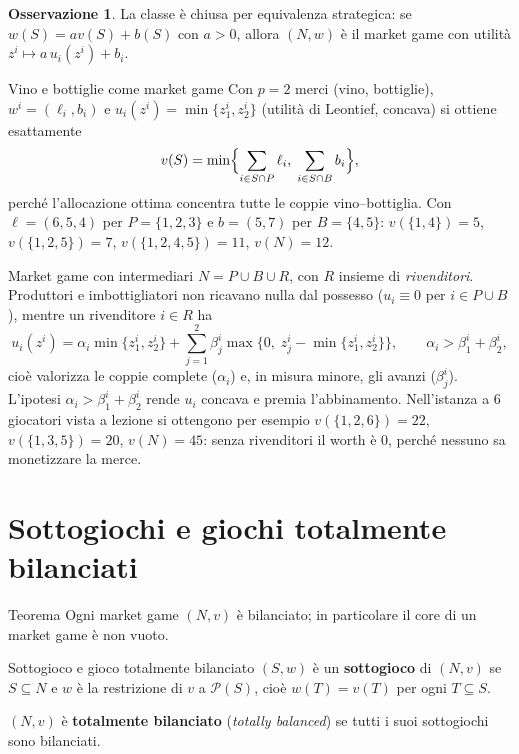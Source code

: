 \documentclass[12pt,a4paper,twoside]{book}
\theoremstyle{plain}
\theoremstyle{definition}
\newtheorem{remark}[theorem]{Osservazione}
\begin{document}
\begin{remark}
La classe è chiusa per equivalenza strategica: se $w(S)=a v(S)+b(S)$ con $a>0$,
allora $(N,w)$ è il market game con utilità $z^i\mapsto a\,u_i(z^i)+b_i$.
\end{remark}

\begin{exbox}{Vino e bottiglie come market game}
Con $p=2$ merci (vino, bottiglie), $w^i=(\ell_i,b_i)$ e
$u_i(z^i)=\min\{z^i_1,z^i_2\}$ (utilità di Leontief, concava) si ottiene
esattamente
\[
  v(S)=\min\Bigl\{\sum_{i\in S\cap P}\ell_i,\;\sum_{i\in S\cap B}b_i\Bigr\},
\]
perché l'allocazione ottima concentra tutte le coppie vino--bottiglia. Con
$\ell=(6,5,4)$ per $P=\{1,2,3\}$ e $b=(5,7)$ per $B=\{4,5\}$: $v(\{1,4\})=5$,
$v(\{1,2,5\})=7$, $v(\{1,2,4,5\})=11$, $v(N)=12$.
\end{exbox}

\begin{exbox}{Market game con intermediari}
$N=P\cup B\cup R$, con $R$ insieme di \emph{rivenditori}. Produttori e
imbottigliatori non ricavano nulla dal possesso ($u_i\equiv 0$ per $i\in P\cup B$),
mentre un rivenditore $i\in R$ ha
\[
  u_i(z^i)=\alpha_i\min\{z^i_1,z^i_2\}+\sum_{j=1}^{2}\beta^i_j\max\{0,\;z^i_j-\min\{z^i_1,z^i_2\}\},
  \qquad \alpha_i>\beta^i_1+\beta^i_2 ,
\]
cioè valorizza le coppie complete ($\alpha_i$) e, in misura minore, gli avanzi
($\beta^i_j$). L'ipotesi $\alpha_i>\beta^i_1+\beta^i_2$ rende $u_i$ concava e
premia l'abbinamento. Nell'istanza a 6 giocatori vista a lezione si ottengono
per esempio $v(\{1,2,6\})=22$, $v(\{1,3,5\})=20$, $v(N)=45$: senza rivenditori
il worth è $0$, perché nessuno sa monetizzare la merce.
\end{exbox}

\section{Sottogiochi e giochi totalmente bilanciati}

\begin{thmbox}{Teorema}
Ogni market game $(N,v)$ è bilanciato; in particolare il core di un market game
è non vuoto.
\end{thmbox}

\begin{defbox}{Sottogioco e gioco totalmente bilanciato}
$(S,w)$ è un \textbf{sottogioco} di $(N,v)$ se $S\subseteq N$ e $w$ è la
restrizione di $v$ a $\mathcal{P}(S)$, cioè $w(T)=v(T)$ per ogni $T\subseteq S$.

$(N,v)$ è \textbf{totalmente bilanciato} (\emph{totally balanced}) se tutti i suoi
sottogiochi sono bilanciati.
\end{defbox}
\end{document}
